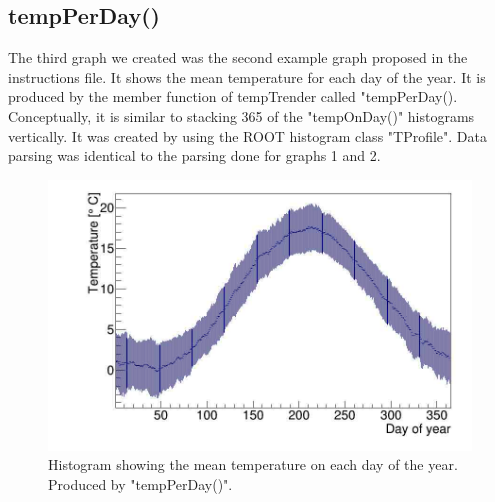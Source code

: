 \subsection{tempPerDay()}

The third graph we created was the second example graph proposed in the instructions file. It shows the mean temperature for each day of the year. It is produced by the member function of tempTrender called "tempPerDay(). Conceptually, it is similar to stacking 365 of the "tempOnDay()" histograms vertically. It was created by using the ROOT histogram class "TProfile".
Data parsing was identical to the parsing done for graphs 1 and 2. 

\begin{figure}[h]
\centering
\includegraphics[scale=0.3]{graph3.png}
\caption{Histogram showing the mean temperature on each day of the year. Produced by "tempPerDay()". }
\end{figure}